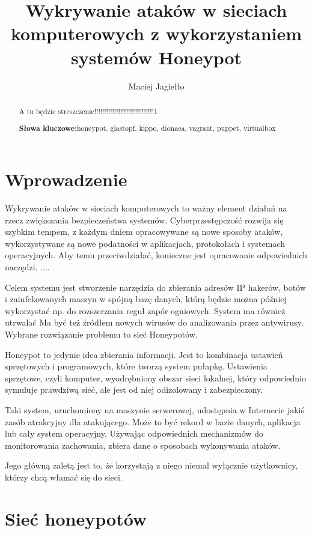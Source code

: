 \documentclass[runningheads,a4paper]{llncs}
\newcommand{\keywords}[1]{\par\addvspace\baselineskip
\noindent\keywordname\enspace\ignorespaces#1}
\renewcommand{\keywordname}{\textbf{Słowa kluczowe:}}
\begin{document}
\mainmatter
\title{Wykrywanie ataków w sieciach komputerowych z wykorzystaniem systemów Honeypot}
\author{Maciej Jagiełło}

\titlerunning{ }
\authorrunning{ }
\institute{}
\maketitle

\begin{abstract}
A tu będzie streszczenie!!!!!!!!!!!!!!!!!!!!!!!!!!!!!!1
\keywords{honeypot, glastopf, kippo, dionaea, vagrant, puppet, virtualbox}
\end{abstract}


\section{Wprowadzenie}

Wykrywanie ataków w sieciach komputerowych to ważny element działań na rzecz zwiększania bezpieczeństwa systemów. Cyberprzestępczość rozwija się szybkim tempem, z każdym dniem opracowywane są nowe sposoby ataków, wykorzystywane są nowe podatności w aplikacjach, protokołach i systemach operacyjnych. Aby temu przeciwdziałać, konieczne jest opracowanie odpowiednich narzędzi. ....

Celem systemu jest stworzenie narzędzia do zbierania adresów IP hakerów, botów i zainfekowanych maszyn w spójną bazę danych, którą będzie można później wykorzystać np. do rozszerzania reguł zapór ogniowych. System ma również utrwalać Ma być też źródłem nowych wirusów do analizowania przez antywirusy. Wybrane rozwiązanie problemu to sieć Honeypotów.

Honeypot to jedynie idea zbierania informacji. Jest to kombinacja ustawień sprzętowych i programowych, które tworzą system pułapkę. Ustawienia sprzętowe, czyli komputer, wyodrębniony obszar sieci lokalnej, który odpowiednio symuluje prawdziwą sieć, ale jest od niej odizolowany i zabezpieczony.

Taki system, uruchomiony na maszynie serwerowej, udostępnia w Internecie jakiś zasób atrakcyjny dla atakującego. Może to być rekord w bazie danych, aplikacja lub cały system operacyjny. Używając odpowiednich mechanizmów do monitorowania zachowania, zbiera dane o sposobach wykonywania ataków.

Jego główną zaletą jest to, że korzystają z niego niemal wyłącznie użytkownicy, którzy chcą włamać się do sieci.

\section{Sieć honeypotów}
\end{document}
